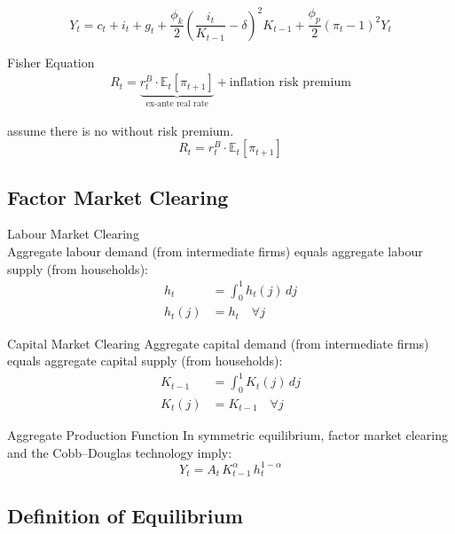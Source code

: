 \documentclass[11pt,preprint]{elsarticle}
\numberwithin{equation}{section}
\numberwithin{figure}{section}
\numberwithin{table}{section}
\begin{document}
\begin{equation}
   Y_t = c_t + i_t + g_t + \frac{\phi_k}{2} \left( \frac{i_t}{K_{t-1}} - \delta \right)^2 K_{t-1} + \frac{\phi_p}{2} (\pi_t - 1)^2 Y_t
   \label{clearing_resource_constraint}
\end{equation}

Fisher Equation \begin{align*}
   R_t = \underbrace{r^B_t \cdot \mathbb{E}_t[\pi_{t+1}]}_{\text{ex-ante real rate}} + \text{inflation risk premium}
\end{align*}

assume there is no without risk premium. \begin{equation}
R_t = r^B_t \cdot \mathbb{E}_t[\pi_{t+1}]  
\end{equation}

\subsection{Factor Market Clearing}\label{factor-market-clearing}

Labour Market Clearing\\
Aggregate labour demand (from intermediate firms) equals aggregate
labour supply (from households): \begin{align}
h_t &= \int_0^1 h_t(j)\,dj
\label{labour_clearing_agg} \\
h_t(j) &= h_t
\quad \forall j
\label{labour_clearing_sym}
\end{align}

Capital Market Clearing Aggregate capital demand (from intermediate
firms) equals aggregate capital supply (from households): \begin{align}
K_{t-1} &= \int_0^1 K_t(j)\,dj
\label{capital_clearing_agg} \\
K_t(j) &= K_{t-1}
\quad \forall j
\label{capital_clearing_sym}
\end{align}

Aggregate Production Function In symmetric equilibrium, factor market
clearing and the Cobb--Douglas technology imply: \begin{equation}
Y_t = A_t\,K_{t-1}^{\alpha}\,h_t^{1-\alpha}
\label{aggregate_production}
\end{equation}

\subsection{Definition of Equilibrium}\label{definition-of-equilibrium}
\end{document}
